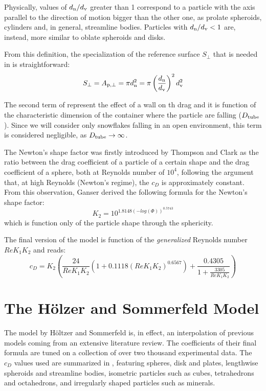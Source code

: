 		Physically, values of $ d_{\textup{n}} / d_{\textup{v}} $ greater than 1 correspond to a particle with the axis parallel to the direction of motion bigger than the other one, as prolate spheroids, cylinders and, in general, streamline bodies. Particles with $ d_{\textup{n}} / d_{\textup{v}} < 1 $ are, instead, more similar to oblate spheroids and disks.
		
		From this definition, the specialization of the reference surface $ S_{\perp} $ that is needed in  is straightforward:
		\begin{equation}
			S_{\perp} = A_{\textup{p}, \perp} = \pi d_{\textup{n}}^2 = \pi \left( \frac{d_{\textup{n}}}{d_{\textup{v}}} \right)^2 d_{\textup{v}}^2
			\label{eq: areaGanser}
		\end{equation}
	
		The second term of  represent the effect of a wall on th drag and it is function of the characteristic dimension of the container where the particle are falling ($ D_{\textup{tube}} $). Since we will consider only snowflakes falling in an open environment, this term is considered negligible, as $ D_{\textup{tube}} \rightarrow \infty $.
		
		The Newton's shape factor was firstly introduced by Thompson and Clark \cite{ThompsonClark-1991} as the ratio between the drag coefficient of a particle of a certain shape and the drag coefficient of a sphere, both at Reynolds number of $ 10^4 $, following the argument that, at high Reynolds (Newton's regime), the $ c_D $ is approximately constant.
		From this observation, Ganser derived the following formula for the Newton's shape factor:
		\begin{equation}
			K_2 = 10^{1.8148 (-log(\Phi))^{0.5743}}
			\label{eq: K2}
		\end{equation}
		which is function only of the particle shape through the sphericity.
		
		The final version of the model is function of the \textit{generalized} Reynolds number $ Re K_1 K_2 $ and reads:
		\begin{equation}
			c_D = K_2 \left( \frac{24}{Re K_1 K_2} (1 + 0.1118 (Re K_1 K_2)^{0.6567}) + \frac{0.4305}{1 + \frac{3305}{Re K_1 K_2}}\right) 
		\end{equation}
			
				
	\section{The H\"{o}lzer and Sommerfeld Model}
		The model by H\"{o}ltzer and Sommerfeld \cite{HoltzerSommerfeld-2008} is, in effect, an interpolation of previous models coming from an extensive literature review. The coefficients of their final formula are tuned on a collection of over two thousand experimental data. The $ c_D $ values used are summarized in , featuring spheres, disk and plates, lengthwise spheroids and streamline bodies, isometric particles such as cubes, tetrahedrons and octahedrons, and irregularly shaped particles such as minerals.
		
